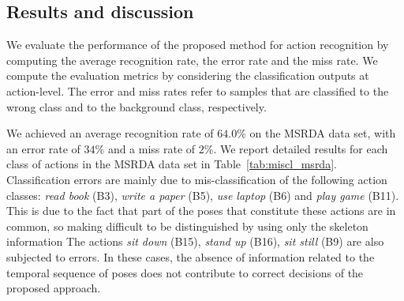 \documentclass[runningheads,a4paper]{llncs}
\begin{document}




\subsection{Results and discussion}

We evaluate the performance of the proposed method for action recognition by computing the average recognition rate, the error rate and the miss rate.  We compute the evaluation metrics by considering the classification outputs at action-level. The error and miss rates refer to samples that are classified to the wrong class and to the background class, respectively.

We achieved an average recognition rate of $64.0\%$ on the MSRDA data set, with an error rate of $34\%$ and a miss rate of $2\%$. We report detailed results for each class of actions in the MSRDA data set in Table~\ref{tab:miscl_msrda}. 
Classification errors are mainly due to mis-classification of the following action classes: \emph{read book} (B3), \emph{write a paper} (B5), \emph{use laptop} (B6) and \emph{play game} (B11). This is due to the fact that part of the poses that constitute these actions are in common, so making difficult to be distinguished by using only the skeleton information
The actions \emph{sit down} (B15), \emph{stand up} (B16), \emph{sit still} (B9) are also subjected to errors. In these cases, the absence of information related to the temporal sequence of poses does not contribute to correct decisions of the proposed approach.


\end{document}
